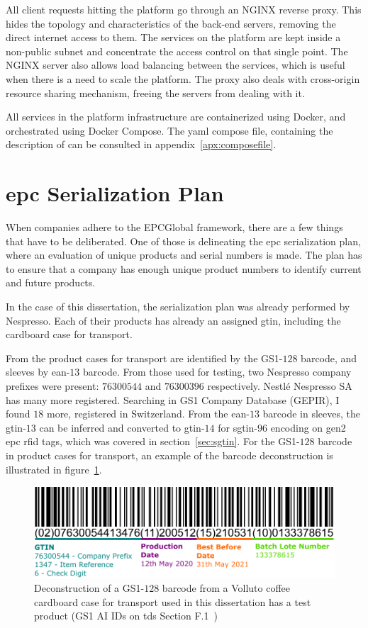All client requests hitting the platform go through an NGINX reverse proxy. This hides the topology and characteristics of the back-end servers, removing the direct internet access to them. The services on the platform are kept inside a non-public subnet and concentrate the access control on that single point. The NGINX server also allows load balancing between the services, which is useful when there is a need to scale the platform. The proxy also deals with cross-origin resource sharing mechanism, freeing the servers from dealing with it.

All services in the platform infrastructure are containerized using Docker, and orchestrated using Docker Compose. The yaml compose file, containing the description of  can be consulted in appendix~\ref{apx:composefile}.

\section{\acs{epc} Serialization Plan}

When companies adhere to the EPCGlobal framework, there are a few things that have to be deliberated.
One of those is delineating the \acs{epc} serialization plan, where an evaluation of unique products and serial numbers is made.
The plan has to ensure that a company has enough unique product numbers to identify current and future products.

In the case of this dissertation, the serialization plan was already performed by Nespresso.
Each of their products has already an assigned \ac{gtin}, including the cardboard case for transport.

From the product cases for transport are identified by the GS1-$128$ barcode, and sleeves by \acs{ean}-$13$ barcode. From those used for testing, two Nespresso company prefixes were present: $76300544$ and $76300396$ respectively. Nestlé Nespresso SA has many more registered. Searching in GS1 Company Database (GEPIR), I found $18$ more, registered in Switzerland.
From the \acs{ean}-$13$ barcode in sleeves, the \acs{gtin}-$13$ can be inferred and converted to \acs{gtin}-$14$ for \ac{sgtin}-$96$ encoding on \ac{gen2} \ac{epc} \acs{rfid} tags, which was covered in section~\ref{sec:sgtin}.
For the GS1-$128$ barcode in product cases for transport, an example of the barcode deconstruction is illustrated in figure~\ref{fig:gs1-128barcode}.

\begin{figure}
    \centering
    \includegraphics[width=\textwidth]{figs/gs1-128barcode.pdf}
    \caption{Deconstruction of a GS1-$128$ barcode from a Volluto coffee cardboard case for transport used in this dissertation has a test product (GS1 AI IDs on \acs{tds} Section F.1~\cite{EPCTagData})}
    \label{fig:gs1-128barcode}
\end{figure}

